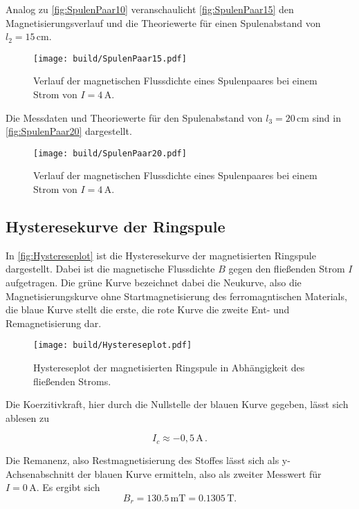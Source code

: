   \newpage
  
  Analog zu \autoref{fig:SpulenPaar10} veranschaulicht \autoref{fig:SpulenPaar15} den Magnetisierungsverlauf und die Theoriewerte
  für einen Spulenabstand von $l_2=15\, \unit{\centi\meter}$.
  \begin{figure}[H]
    \centering
    \texttt{[image: build/SpulenPaar15.pdf]}
    \caption{Verlauf der magnetischen Flussdichte eines Spulenpaares bei einem Strom von $I= 4 \, \unit{\ampere}$.}
    \label{fig:SpulenPaar15}
  \end{figure}

  \newpage

  Die Messdaten und Theoriewerte für den Spulenabstand von $l_3=20\, \unit{\centi\meter}$ sind in 
  \autoref{fig:SpulenPaar20} dargestellt.
  \begin{figure}[H]
    \centering
    \texttt{[image: build/SpulenPaar20.pdf]}
    \caption{Verlauf der magnetischen Flussdichte eines Spulenpaares bei einem Strom von $I= 4 \, \unit{\ampere}$.}
    \label{fig:SpulenPaar20}
  \end{figure}

\newpage

\subsection{Hysteresekurve der Ringspule}

In \autoref{fig:Hystereseplot} ist die Hysteresekurve der magnetisierten Ringspule dargestellt. Dabei ist die magnetische
Flussdichte $B$ gegen den fließenden Strom $I$ aufgetragen. Die grüne Kurve bezeichnet dabei die Neukurve, also die Magnetisierungskurve
ohne Startmagnetisierung des ferromagntischen Materials, die blaue Kurve stellt die erste, die rote Kurve die zweite Ent- und Remagnetisierung dar.

\begin{figure}[H]
    \centering
    \texttt{[image: build/Hystereseplot.pdf]}
    \caption{Hystereseplot der magnetisierten Ringspule in Abhängigkeit des fließenden Stroms.}
    \label{fig:Hystereseplot}
  \end{figure}

  Die Koerzitivkraft, hier durch die Nullstelle der blauen Kurve gegeben, lässt sich ablesen zu

  \begin{equation*}
    I_c \approx -0,5 \, \unit{\ampere} \,.
  \end{equation*}

  Die Remanenz, also Restmagnetisierung des Stoffes lässt sich als y-Achsenabschnitt der blauen Kurve ermitteln, also
  als zweiter Messwert für $I=0 \, \unit{\ampere}$.
  Es ergibt sich
  \begin{equation*}
    B_r = 130.5 \, \unit{\milli\tesla} = 0.1305 \, \unit{\tesla}. 
  \end{equation*}
